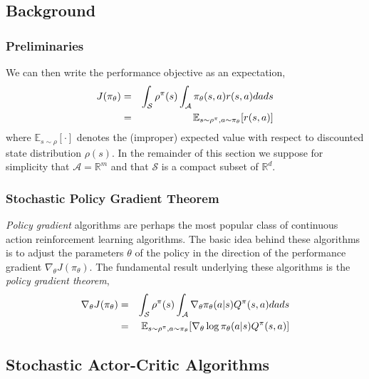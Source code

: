 \subsection{Background}

\subsubsection{Preliminaries}

We can then write the performance objective as an expectation,
\begin{eqnarray}\label{eq_DPG_performance_objective}
J(\pi_\theta) &=& \int_\mathcal{S}\rho^\pi(s)\int_\mathcal{A}\pi_\theta
(s,a) r(s,a) dads \notag \\
&=& \mathbb{E}_{s\sim\rho^\pi, a\sim\pi_\theta}[r(s,a)]
\end{eqnarray}
where $\mathbb{E}_{s\sim\rho}[\cdot]$ denotes the (improper) expected 
value with respect to discounted state distribution $\rho(s)$. In the 
remainder of this section we suppose for simplicity that $\mathcal{A} 
= \mathbb{R}^m$ and that $\mathcal{S}$ is a compact subset of $\mathbb{R}^d$.

\subsubsection{Stochastic Policy Gradient Theorem}

\emph{Policy gradient} algorithms are perhaps the most popular class of 
continuous action reinforcement learning algorithms. The basic idea behind 
these algorithms is to adjust the parameters $\theta$ of the policy in the 
direction of the performance gradient $\nabla_\theta J(\pi_\theta)$. The 
fundamental result underlying these algorithms is the \emph{policy 
gradient theorem},
\begin{eqnarray}\label{eq_DPG_policy_gradient_theorem}
\nabla_\theta J(\pi_\theta)
&=& \int_\mathcal{S}\rho^\pi(s)\int_\mathcal{A}\nabla_\theta\pi_\theta
(a|s)Q^\pi(s,a) da ds \notag \\
&=& \mathbb{E}_{s\sim\rho^\pi, a\sim\pi_\theta}
[\nabla_\theta\log\pi_\theta(a|s)Q^\pi(s,a)]
\end{eqnarray}


\subsection{Stochastic Actor-Critic Algorithms}

